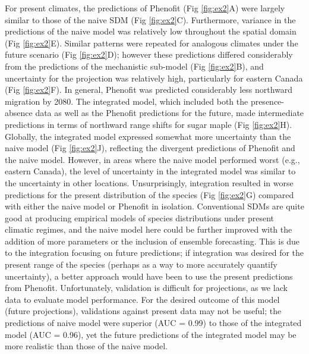 \documentclass[11pt]{article}
\begin{document}
For present climates, the predictions of Phenofit (Fig \ref{fig:ex2}A) were largely similar to those of the naive SDM (Fig \ref{fig:ex2}C). 
Furthermore, variance in the predictions of the naive model was relatively low throughout the spatial domain (Fig \ref{fig:ex2}E).
Similar patterns were repeated for analogous climates under the future scenario (Fig \ref{fig:ex2}D); however these predictions differed considerably from the predictions of the mechanistic sub-model (Fig \ref{fig:ex2}B), and uncertainty for the projection was relatively high, particularly for eastern Canada (Fig \ref{fig:ex2}F).
In general, Phenofit was predicted considerably less northward migration by 2080.
The integrated model, which included both the presence-absence data as well as the Phenofit predictions for the future, made intermediate predictions in terms of northward range shifts for sugar maple (Fig \ref{fig:ex2}H).
Globally, the integrated model expressed somewhat more uncertainty than the naive model (Fig \ref{fig:ex2}J), reflecting the divergent predictions of Phenofit and the naive model.
However, in areas where the naive model performed worst (e.g., eastern Canada), the level of uncertainty in the integrated model was similar to the uncertainty in other locations.
Unsurprisingly, integration resulted in worse predictions for the present distribution of the species (Fig \ref{fig:ex2}G) compared with either the naive model or Phenofit in isolation.
Conventional SDMs are quite good at producing empirical models of species distributions under present climatic regimes, and the naive model here could be further improved with the addition of more parameters or the inclusion of ensemble forecasting.
This is due to the integration focusing on future predictions; if integration was desired for the present range of the species (perhaps as a way to more accurately quantify uncertainty), a better approach would have been to use the present predictions from Phenofit.
Unfortunately, validation is difficult for projections, as we lack data to evaluate model performance.
For the desired outcome of this model (future projections), validations against present data may not be useful; the predictions of naive model were superior (AUC = 0.99) to those of the integrated model (AUC = 0.96), yet the future predictions of the integrated model may be more realistic than those of the naive model.



%
%
\end{document}
